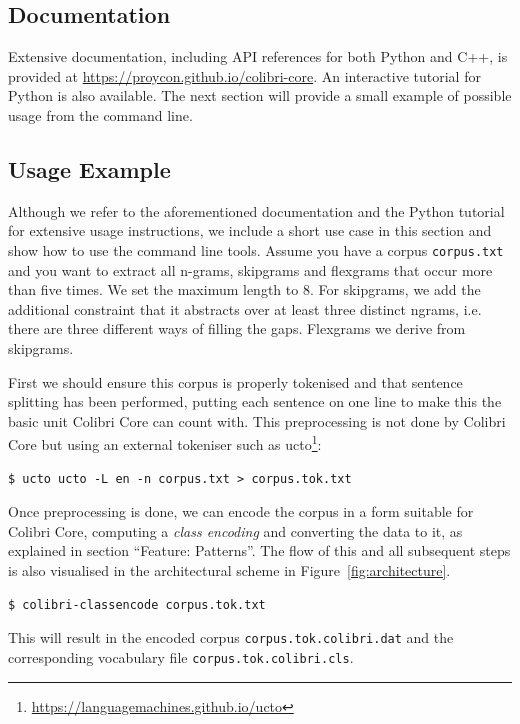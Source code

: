 \FloatBarrier

\subsection*{Documentation}

Extensive documentation, including API references for both Python and C++, is provided at
\url{https://proycon.github.io/colibri-core}. An interactive tutorial for Python is also
available. The next section will provide a small example of possible usage from the command line.

\subsection*{Usage Example}

Although we refer to the aforementioned documentation and the Python tutorial
for extensive usage instructions, we include a short use case in this section
and show how to use the command line tools.  Assume you have a corpus
\texttt{corpus.txt} and you want to extract all n-grams, skipgrams and
flexgrams that occur more than five times. We set the maximum length to $8$. For
skipgrams, we add the additional constraint that it abstracts over at least
three distinct ngrams, i.e. there are three different ways of filling the gaps.
Flexgrams we derive from skipgrams.

First we should ensure this corpus is properly tokenised and that sentence
splitting has been performed, putting each sentence on one line to make this
the basic unit Colibri Core can count with. This preprocessing is not done by
Colibri Core but using an external tokeniser such as ucto\footnote{\url{https://languagemachines.github.io/ucto}}:

\begin{verbatim}
$ ucto ucto -L en -n corpus.txt > corpus.tok.txt
\end{verbatim}

Once preprocessing is done, we can encode the corpus in a form suitable for
Colibri Core, computing a \emph{class encoding} and converting the data to it,
as explained in section ``Feature: Patterns''.  The flow of this and all
subsequent steps is also visualised in the architectural scheme in
Figure~\ref{fig:architecture}.

\begin{verbatim}
$ colibri-classencode corpus.tok.txt
\end{verbatim}

This will result in the encoded corpus \texttt{corpus.tok.colibri.dat} and the corresponding vocabulary file \texttt{corpus.tok.colibri.cls}.

